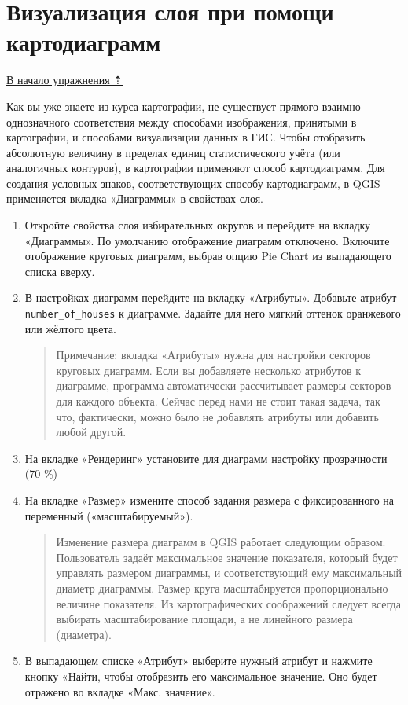 \documentclass[
  12pt,
]{book}
\begin{document}
\hypertarget{digitizing-diagrams}{%
\section{Визуализация слоя при помощи картодиаграмм}\label{digitizing-diagrams}}

\protect\hyperlink{digitizing-districts}{В начало упражнения ⇡}

Как вы уже знаете из курса картографии, не существует прямого взаимно-однозначного соответствия между способами изображения, принятыми в картографии, и способами визуализации данных в ГИС. Чтобы отобразить абсолютную величину в пределах единиц статистического учёта (или аналогичных контуров), в картографии применяют способ картодиаграмм. Для создания условных знаков, соответствующих способу картодиаграмм, в QGIS применяется вкладка «Диаграммы» в свойствах слоя.

\begin{enumerate}
\def\labelenumi{\arabic{enumi}.}
\item
  Откройте свойства слоя избирательных округов и перейдите на вкладку «Диаграммы». По умолчанию отображение диаграмм отключено. Включите отображение круговых диаграмм, выбрав опцию Pie Chart из выпадающего списка вверху.
\item
  В настройках диаграмм перейдите на вкладку «Атрибуты». Добавьте атрибут \texttt{number\_of\_houses} к диаграмме. Задайте для него мягкий оттенок оранжевого или жёлтого цвета.

  \begin{quote}
  Примечание: вкладка «Атрибуты» нужна для настройки секторов круговых диаграмм. Если вы добавляете несколько атрибутов к диаграмме, программа автоматически рассчитывает размеры секторов для каждого объекта. Сейчас перед нами не стоит такая задача, так что, фактически, можно было не добавлять атрибуты или добавить любой другой.
  \end{quote}
\item
  На вкладке «Рендеринг» установите для диаграмм настройку прозрачности (70 \%)
\item
  На вкладке «Размер» измените способ задания размера с фиксированного на переменный («масштабируемый»).

  \begin{quote}
  Изменение размера диаграмм в QGIS работает следующим образом. Пользователь задаёт максимальное значение показателя, который будет управлять размером диаграммы, и соответствующий ему максимальный диаметр диаграммы. Размер круга масштабируется пропорционально величине показателя. Из картографических соображений следует всегда выбирать масштабирование площади, а не линейного размера (диаметра).
  \end{quote}
\item
  В выпадающем списке «Атрибут» выберите нужный атрибут и нажмите кнопку «Найти, чтобы отобразить его максимальное значение. Оно будет отражено во вкладке «Макс. значение».
\end{enumerate}
\end{document}
